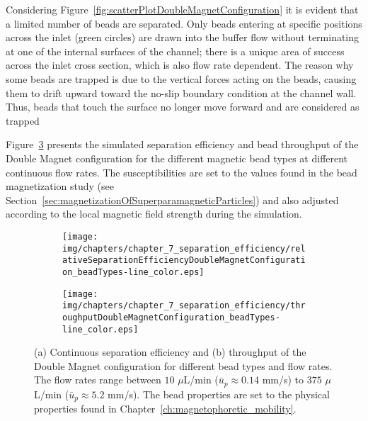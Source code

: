 Considering Figure~\ref{fig:scatterPlotDoubleMagnetConfiguration} it is evident that a limited number of beads are separated. Only beads entering at specific positions across the inlet (green circles) are drawn into the buffer flow without terminating at one of the internal surfaces of the channel; there is a unique area of success across the inlet cross section, which is also flow rate dependent. The reason why some beads are trapped is due to the vertical forces acting on the beads, causing them to drift upward toward the no-slip boundary condition at the channel wall. Thus, beads that touch the surface no longer move forward and are considered as trapped

Figure~\ref{fig:separationAndThroughput_beadTypes_color} presents the simulated separation efficiency and bead throughput of the Double Magnet configuration for the different magnetic bead types at different continuous flow rates. The susceptibilities are set to the values found in the bead magnetization study (see Section~\ref{sec:magnetizationOfSuperparamagneticParticles}) and also adjusted according to the local magnetic field strength during the simulation.

\begin{figure}[htb]
\centering
    \begin{subfigure}[b]{0.48\textwidth}
         \texttt{[image: img/chapters/chapter\_7\_separation\_efficiency/relativeSeparationEfficiencyDoubleMagnetConfiguration\_beadTypes-line\_color.eps]}
        \caption{}
        \label{fig:relativeSeparationEfficiencyDoubleMagnetConfiguration_beadTypes_color}
    \end{subfigure}
    \hfill
    \begin{subfigure}[b]{0.48\textwidth}
         \texttt{[image: img/chapters/chapter\_7\_separation\_efficiency/throughputDoubleMagnetConfiguration\_beadTypes-line\_color.eps]}
        \caption{}
        \label{fig:throughputDoubleMagnetConfiguration_beadTypes_color}
    \end{subfigure}
\caption[Relative magnetic separation efficiency and throughput of the analysed magnetic bead types for different flow rates using the Double Magnet configuration]{(a) Continuous separation efficiency and (b) throughput of the Double Magnet configuration for different bead types and flow rates. The flow rates range between $10$ $\mu$L/min ($\bar{u}_{p}\approx0.14$ mm/s) to $375$ $\mu$L/min ($\bar{u}_{p}\approx5.2$ mm/s). The bead properties are set to the physical properties found in Chapter~\ref{ch:magnetophoretic_mobility}.}
\label{fig:separationAndThroughput_beadTypes_color}
\end{figure}

